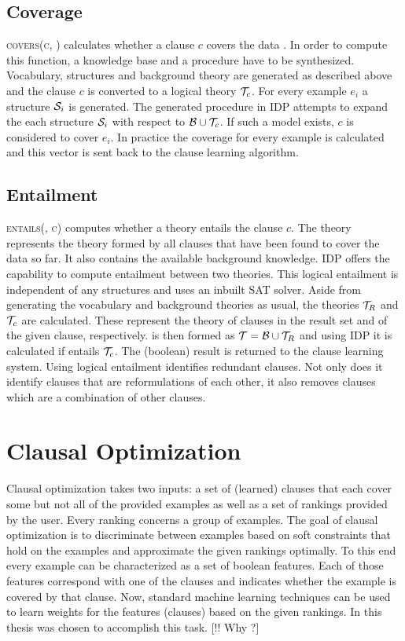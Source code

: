 \subsection{Coverage}
\textsc{covers(c, )} calculates whether a clause $c$ covers the data . In order to compute this function, a knowledge base and a procedure have to be synthesized. Vocabulary, structures and background theory are generated as described above and the clause $c$ is converted to a logical theory $\mathcal{T}_c$. For every example $e_i$ a structure $\mathcal{S}_i$ is generated. The generated procedure in IDP attempts to expand the each structure $\mathcal{S}_i$ with respect to $\mathcal{B} \cup \mathcal{T}_c$. If such a model exists, $c$ is considered to cover $e_i$. In practice the coverage for every example is calculated and this vector is sent back to the clause learning algorithm.

\subsection{Entailment}
\textsc{entails(, c)} computes whether a theory  entails the clause $c$. The theory  represents the theory formed by all clauses that have been found to cover the data so far. It also contains the available background knowledge. IDP offers the capability to compute entailment between two theories. This logical entailment is independent of any structures and uses an inbuilt SAT solver. Aside from generating the vocabulary and background theories as usual, the theories $\mathcal{T}_R$ and $\mathcal{T}_c$ are calculated. These represent the theory of clauses in the result set and of the given clause, respectively.  is then formed as $\mathcal{T} = \mathcal{B} \cup \mathcal{T}_R$ and using IDP it is calculated if  entails $\mathcal{T}_c$. The (boolean) result is returned to the clause learning system. Using logical entailment identifies redundant clauses. Not only does it identify clauses that are reformulations of each other, it also removes clauses which are a combination of other clauses.

\section{Clausal Optimization}
Clausal optimization takes two inputs: a set of (learned) clauses that each cover some but not all of the provided examples as well as a set of rankings provided by the user. Every ranking concerns a group of examples. The goal of clausal optimization is to discriminate between examples based on soft constraints that hold on the examples and approximate the given rankings optimally. To this end every example can be characterized as a set of boolean features. Each of those features correspond with one of the clauses and indicates whether the example is covered by that clause. Now, standard machine learning techniques can be used to learn weights for the features (clauses) based on the given rankings. In this thesis \svm{} was chosen to accomplish this task. [!! Why \svm{}?]

